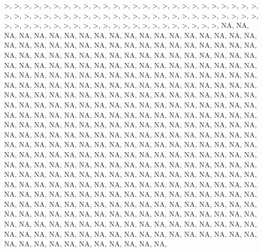 \documentclass[12pt,]{article}
\begin{document}
\textgreater{}, \textgreater{}, \textgreater{}, \textgreater{},
\textgreater{}, \textgreater{}, \textgreater{}, \textgreater{},
\textgreater{}, \textgreater{}, \textgreater{}, \textgreater{},
\textgreater{}, \textgreater{}, \textgreater{}, \textgreater{},
\textgreater{}, \textgreater{}, \textgreater{}, \textgreater{},
\textgreater{}, \textgreater{}, \textgreater{}, \textgreater{},
\textgreater{}, \textgreater{}, \textgreater{}, \textgreater{},
\textgreater{}, \textgreater{}, \textgreater{}, \textgreater{},
\textgreater{}, \textgreater{}, \textgreater{}, \textgreater{},
\textgreater{}, \textgreater{}, \textgreater{}, \textgreater{},
\textgreater{}, \textgreater{}, \textgreater{}, \textgreater{},
\textgreater{}, \textgreater{}, \textgreater{}, \textgreater{},
\textgreater{}, \textgreater{}, \textgreater{}, \textgreater{},
\textgreater{}, \textgreater{}, \textgreater{}, \textgreater{},
\textgreater{}, \textgreater{}, \textgreater{}, \textgreater{},
\textgreater{}, \textgreater{}, \textgreater{}, \textgreater{},
\textgreater{}, \textgreater{}, \textgreater{}, \textgreater{},
\textgreater{}, \textgreater{}, \textgreater{}, \textgreater{},
\textgreater{}, \textgreater{}, NA, NA, NA, NA, NA, NA, NA, NA, NA, NA,
NA, NA, NA, NA, NA, NA, NA, NA, NA, NA, NA, NA, NA, NA, NA, NA, NA, NA,
NA, NA, NA, NA, NA, NA, NA, NA, NA, NA, NA, NA, NA, NA, NA, NA, NA, NA,
NA, NA, NA, NA, NA, NA, NA, NA, NA, NA, NA, NA, NA, NA, NA, NA, NA, NA,
NA, NA, NA, NA, NA, NA, NA, NA, NA, NA, NA, NA, NA, NA, NA, NA, NA, NA,
NA, NA, NA, NA, NA, NA, NA, NA, NA, NA, NA, NA, NA, NA, NA, NA, NA, NA,
NA, NA, NA, NA, NA, NA, NA, NA, NA, NA, NA, NA, NA, NA, NA, NA, NA, NA,
NA, NA, NA, NA, NA, NA, NA, NA, NA, NA, NA, NA, NA, NA, NA, NA, NA, NA,
NA, NA, NA, NA, NA, NA, NA, NA, NA, NA, NA, NA, NA, NA, NA, NA, NA, NA,
NA, NA, NA, NA, NA, NA, NA, NA, NA, NA, NA, NA, NA, NA, NA, NA, NA, NA,
NA, NA, NA, NA, NA, NA, NA, NA, NA, NA, NA, NA, NA, NA, NA, NA, NA, NA,
NA, NA, NA, NA, NA, NA, NA, NA, NA, NA, NA, NA, NA, NA, NA, NA, NA, NA,
NA, NA, NA, NA, NA, NA, NA, NA, NA, NA, NA, NA, NA, NA, NA, NA, NA, NA,
NA, NA, NA, NA, NA, NA, NA, NA, NA, NA, NA, NA, NA, NA, NA, NA, NA, NA,
NA, NA, NA, NA, NA, NA, NA, NA, NA, NA, NA, NA, NA, NA, NA, NA, NA, NA,
NA, NA, NA, NA, NA, NA, NA, NA, NA, NA, NA, NA, NA, NA, NA, NA, NA, NA,
NA, NA, NA, NA, NA, NA, NA, NA, NA, NA, NA, NA, NA, NA, NA, NA, NA, NA,
NA, NA, NA, NA, NA, NA, NA, NA, NA, NA, NA, NA, NA, NA, NA, NA, NA, NA,
NA, NA, NA, NA, NA, NA, NA, NA, NA, NA, NA, NA, NA, NA, NA, NA, NA, NA,
NA, NA, NA, NA, NA, NA, NA, NA, NA, NA, NA, NA, NA, NA, NA, NA, NA, NA,
NA, NA, NA, NA, NA, NA, NA, NA, NA, NA, NA, NA, NA, NA, NA, NA, NA, NA,
\end{document}
